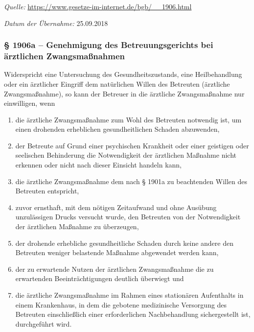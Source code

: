 \textit{Quelle:} \url{https://www.gesetze-im-internet.de/bgb/__1906.html}

\textit{Datum der Übernahme:} 25.09.2018


\subsubsection*{§ 1906a -- Genehmigung des Betreuungsgerichts bei ärztlichen Zwangsmaßnahmen}

\begin{legal}

\item  Widerspricht eine Untersuchung des Gesundheitszustands, eine Heilbehandlung oder ein ärztlicher Eingriff dem natürlichen Willen des Betreuten (ärztliche Zwangsmaßnahme), so kann der Betreuer in die ärztliche Zwangsmaßnahme nur einwilligen, wenn

\begin{enumerate}
\item die ärztliche Zwangsmaßnahme zum Wohl des Betreuten notwendig ist, um einen drohenden erheblichen gesundheitlichen Schaden abzuwenden,

\item der Betreute auf Grund einer psychischen Krankheit oder einer geistigen oder seelischen Behinderung die Notwendigkeit der ärztlichen Maßnahme nicht erkennen oder nicht nach dieser Einsicht handeln kann,

\item die ärztliche Zwangsmaßnahme dem nach § 1901a zu beachtenden Willen des Betreuten entspricht,

\item zuvor ernsthaft, mit dem nötigen Zeitaufwand und ohne Ausübung unzulässigen Drucks versucht wurde, den Betreuten von der Notwendigkeit der ärztlichen Maßnahme zu überzeugen,

\item der drohende erhebliche gesundheitliche Schaden durch keine andere den Betreuten weniger belastende Maßnahme abgewendet werden kann,

\item der zu erwartende Nutzen der ärztlichen Zwangsmaßnahme die zu erwartenden Beeinträchtigungen deutlich überwiegt und

\item die ärztliche Zwangsmaßnahme im Rahmen eines stationären Aufenthalts in einem Krankenhaus, in dem die gebotene medizinische Versorgung des Betreuten einschließlich einer erforderlichen Nachbehandlung sichergestellt ist, durchgeführt wird.


\end{enumerate}
\end{legal}
